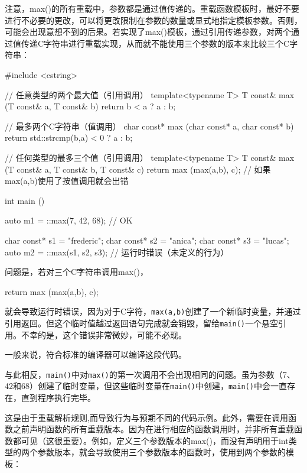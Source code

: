 注意，max()的所有重载中，参数都是通过值传递的。重载函数模板时，最好不要进行不必要的更改，可以将更改限制在参数的数量或显式地指定模板参数。否则，可能会出现意想不到的后果。若实现了max()模板，通过引用传递参数，对两个通过值传递C字符串进行重载实现，从而就不能使用三个参数的版本来比较三个C字符串：

\begin{cpp}
#include <cstring>

// 任意类型的两个最大值（引用调用）
template<typename T>
T const& max (T const& a, T const& b) {
	return b < a ? a : b;
}

// 最多两个C字符串（值调用）
char const* max (char const* a, char const* b) {
	return std::strcmp(b,a) < 0 ? a : b;
}

// 任何类型的最多三个值（引用调用）
template<typename T>
T const& max (T const& a, T const& b, T const& c) {
	return max (max(a,b), c); // 如果max(a,b)使用了按值调用就会出错
}

int main () {
	auto m1 = ::max(7, 42, 68); // OK
	
	char const* s1 = "frederic";
	char const* s2 = "anica";
	char const* s3 = "lucas";
	auto m2 = ::max(s1, s2, s3); // 运行时错误（未定义的行为）
}
\end{cpp}

问题是，若对三个C字符串调用max()，

\begin{cpp}
return max (max(a,b), c);
\end{cpp}

就会导致运行时错误，因为对于C字符，\texttt{max(a,b)}创建了一个新临时变量，并通过引用返回。但这个临时值越过返回语句完成就会销毁，留给\texttt{main()}一个悬空引用。不幸的是，这个错误非常微妙，可能不必现。

\begin{notice}
一般来说，符合标准的编译器可以编译这段代码。
\end{notice}

与此相反，\texttt{main()}中对\texttt{max()}的第一次调用不会出现相同的问题。虽为参数（7、42和68）创建了临时变量，但这些临时变量在\texttt{main()}中创建，\texttt{main()}中会一直存在，直到程序执行完毕。

这是由于重载解析规则,而导致行为与预期不同的代码示例。此外，需要在调用函数之前声明函数的所有重载版本。因为在进行相应的函数调用时，并非所有重载函数都可见（这很重要）。例如，定义三个参数版本的max()，而没有声明用于int类型的两个参数版本，就会导致使用三个参数版本的函数时，使用到两个参数的模板：

